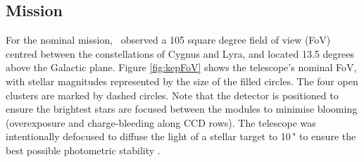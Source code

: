 \subsection{Mission}
For the nominal mission, \Kepler~observed a 105 square degree field of view (FoV) centred between the constellations of Cygnus and Lyra, and located 13.5 degrees above the Galactic plane. Figure \ref{fig:kepFoV} shows the telescope's nominal FoV, with stellar magnitudes represented by the size of the filled circles. The four open clusters are marked by dashed circles. Note that the detector is positioned to ensure the brightest stars are focused between the modules to minimise blooming (overexposure and charge-bleeding along CCD rows). The telescope was intentionally defocused to diffuse the light of a stellar target to 10\," to ensure the best possible photometric stability \citep{gould_sensitivity_2003}.

